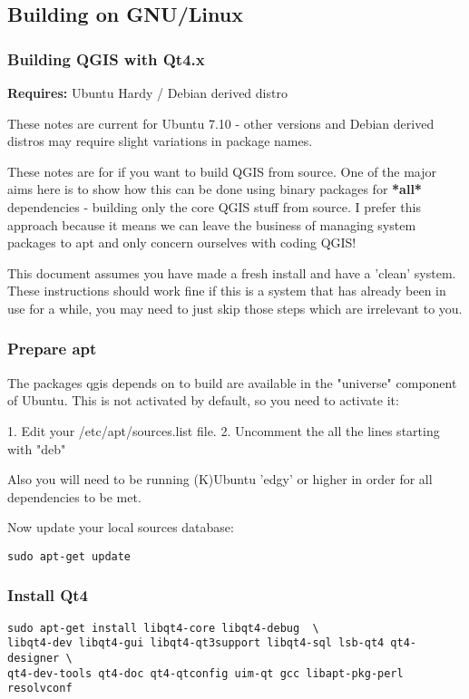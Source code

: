 \hypertarget{toc42}{}
\subsection{Building on GNU/Linux}
\hypertarget{toc43}{}
\subsubsection{Building QGIS with Qt4.x}
\textbf{Requires:} Ubuntu Hardy / Debian derived distro

These notes are current for Ubuntu 7.10 - other versions and Debian derived 
distros may require slight variations in package names.

These notes are for if you want to build QGIS from source. One of the major
aims here is to show how this can be done using binary packages for \textbf{*all*}
dependencies - building only the core QGIS stuff from source. I prefer this
approach because it means we can leave the business of managing system packages
to apt and only concern ourselves with coding QGIS! 

This document assumes you have made a fresh install and have a 'clean' system.
These instructions should work fine if this is a system that has already been
in use for a while, you may need to just skip those steps which are irrelevant
to you.

\hypertarget{toc44}{}
\subsubsection{Prepare apt}
The packages qgis depends on to build are available in the "universe" component
of Ubuntu. This is not activated by default, so you need to activate it:

1. Edit your /etc/apt/sources.list file.  
2. Uncomment the all the lines starting with "deb"

Also you will need to be running (K)Ubuntu 'edgy' or higher in order for 
all dependencies to be met.

Now update your local sources database:

\begin{verbatim}
sudo apt-get update 
\end{verbatim}

\hypertarget{toc45}{}
\subsubsection{Install Qt4}
\begin{verbatim}
sudo apt-get install libqt4-core libqt4-debug  \
libqt4-dev libqt4-gui libqt4-qt3support libqt4-sql lsb-qt4 qt4-designer \
qt4-dev-tools qt4-doc qt4-qtconfig uim-qt gcc libapt-pkg-perl resolvconf
\end{verbatim}

